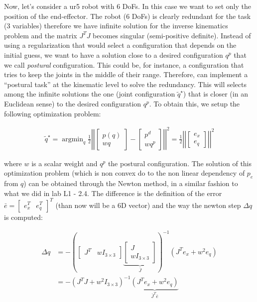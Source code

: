 \documentclass[11pt]{article}
\newcommand{\mat}[1]{\ensuremath{\begin{bmatrix}#1\end{bmatrix}}}	%
\DeclareMathOperator*{\argmin}{argmin}
\begin{document}
Now, let's consider a ur5 robot with 6 DoFs. In this case we want to set only the position of the end-effector. The robot (6 DoFs) is clearly redundant for the task (3 variables) therefore we have infinite  solution for the inverse kinematics problem and the matrix $J^TJ$ becomes singular (semi-positive definite). Instead of using a regularization that would select a configuration that depends on the initial guess, we want to have a solution close to a desired configuration $q^p$ that we call \textit{postural} configuration. This could be, for instance, a configuration that tries to keep the joints in the middle of their range. Therefore,  can implement a ``postural task'' at the kinematic level to solve the redundancy.
This will  selects among the infinite solutions the one (joint configuration $\tilde{q}^\star$) that is closer (in an Euclidean sense) to the desired configuration $q^p$. 
To obtain this, we setup the following optimization problem:

\begin{align*}
\tilde{q}^\star = \argmin_q \frac{1}{2} \left|\left| \mat{p(q) \\ w q } - \mat{p^d \\ w q^p }   \right|\right|^2 = \frac{1}{2} \left|\left| \mat{ e_x \\ e_q }   \right|\right|^2
\end{align*}

where $w$ is a scalar weight and $q^p$ the postural configuration. The solution of this optimization problem (which is non convex do to the non linear dependency of $p_e$ from $q$) can be obtained through the Newton method, in a similar fashion to what we did in lab L1 - 2.4. The difference is the definition of the error $\bar{e} = \mat{e_x^T & e_q^T}^T$ (than now will be a 6D vector) and the way the newton step $\Delta q$ is computed:


\begin{align*}
\Delta q &= -\left( \mat { J^T &  wI_{3 \times 3} } \underbrace{ \mat{J  \\ wI_{3 \times 3}}}_{\bar{J}} \right)^{-1} \left(J^T e_x + w^2e_q \right) \\
&= -\left( J^TJ + w^2I_{3 \times 3}\right)^{-1} \underbrace{ \left(J^T e_x + w^2 e_q \right) }_{\bar{J}^T\bar{e}}
\end{align*}

\end{document}
